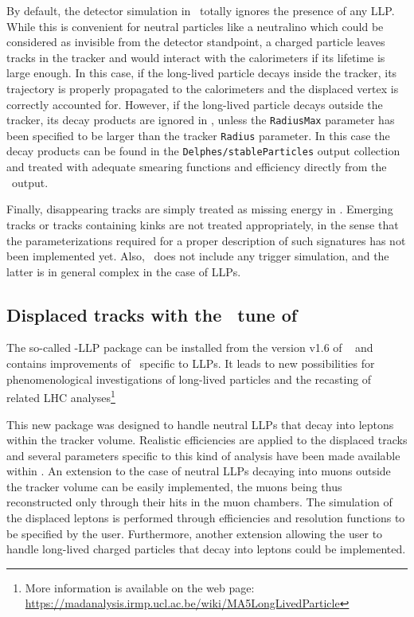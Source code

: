 By default, the detector simulation in \DEL\ totally ignores the presence of any
LLP. While this is convenient for neutral particles like a
neutralino which could be considered as invisible from the detector standpoint,
a charged particle leaves tracks in the tracker and would interact with the
calorimeters if its lifetime is large enough.
In this case, if the long-lived particle decays inside the tracker, its
trajectory is properly propagated to the calorimeters and the displaced vertex
is correctly accounted for. However, if the long-lived particle decays outside
the tracker, its decay products are ignored in \DEL, unless the \verb+RadiusMax+
parameter has been specified to be larger than the tracker \verb+Radius+
parameter. In this case the decay products can be found in the
\verb+Delphes/stableParticles+ output collection and
treated with adequate smearing functions and efficiency directly from the \DEL\
output.

Finally, disappearing tracks are simply treated as missing energy in \DEL. Emerging tracks or tracks containing kinks are not treated appropriately, in the sense that the parameterizations required for a proper description of such signatures has not been implemented yet. Also, \DEL\ does not include any trigger simulation, and the latter is in general complex in the case of LLPs.

\subsection{Displaced tracks with the \MA\ tune of \DEL}

The so-called \DEL-LLP package can be installed from the version v1.6 of
\MA~\cite{Conte:2012fm,Conte:2014zja} and contains improvements of \DEL\
specific to LLPs. It
leads to new possibilities for phenomenological investigations of long-lived
particles and the recasting of related LHC analyses\footnote{More information is
available on the web page:\\ \noindent \url{https://madanalysis.irmp.ucl.ac.be/wiki/MA5LongLivedParticle}}

This new package was designed to handle neutral LLPs that decay
into leptons within the tracker volume. Realistic efficiencies are applied to
the displaced tracks and several parameters specific to this kind of analysis
have been made available within \MA. An extension to the case of neutral
LLPs decaying into muons outside the tracker volume can be easily
implemented, the muons being thus reconstructed only through their hits in the
muon chambers. The simulation of the displaced leptons is performed through efficiencies and resolution functions to be specified by the user. Furthermore, another
extension allowing the user to handle long-lived charged particles that decay into
leptons could be implemented.

